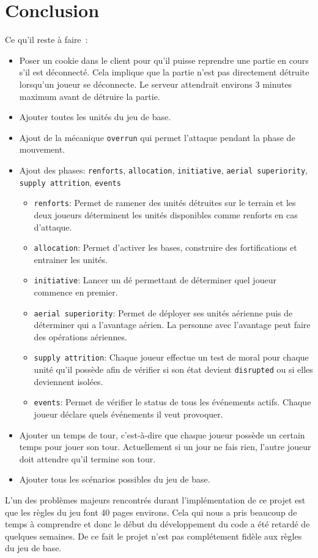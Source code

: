 \section{Conclusion}

Ce qu'il reste à faire :
\begin{itemize}
    \item Poser un cookie dans le client pour qu'il puisse reprendre une partie en cours s'il est déconnecté.
          Cela implique que la partie n'est pas directement détruite lorsqu'un joueur se déconnecte. Le serveur attendrait environs 3 minutes maximum avant de détruire la partie.
    \item Ajouter toutes les unités du jeu de base.
    \item Ajout de la mécanique {\tt overrun} qui permet l'attaque pendant la phase de mouvement.
    \item Ajout des phases: {\tt renforts}, {\tt allocation}, {\tt initiative}, {\tt aerial superiority}, {\tt supply attrition}, {\tt events}
          \begin{itemize}
              \item {\tt renforts}: Permet de ramener des unités détruites sur le terrain et les deux joueurs déterminent les unités disponibles comme renforts en cas d'attaque.
              \item {\tt allocation}: Permet d'activer les bases, construire des fortifications et entrainer les unités.
              \item {\tt initiative}: Lancer un dé permettant de déterminer quel joueur commence en premier.
              \item {\tt aerial superiority}: Permet de déployer ses unités aérienne puis de déterminer qui a l'avantage aérien.
                    La personne avec l'avantage peut faire des opérations aériennes.
              \item {\tt supply attrition}: Chaque joueur effectue un test de moral pour chaque unité qu'il possède afin de vérifier si son état devient {\tt disrupted} ou si elles deviennent isolées.
              \item {\tt events}: Permet de vérifier le status de tous les événements actifs. Chaque joueur déclare quels événements il veut provoquer.
          \end{itemize}
    \item Ajouter un temps de tour, c'est-à-dire que chaque joueur possède un certain temps pour jouer son tour. Actuellement si un jour ne fais rien, l'autre joueur doit attendre qu'il termine son tour.
    \item Ajouter tous les scénarios possibles du jeu de base.
\end{itemize}

L'un des problèmes majeurs rencontrés durant l'implémentation de ce projet est que les règles du jeu font 40 pages environs.
Cela qui nous a pris beaucoup de temps à comprendre et donc le début du développement du code a été retardé de quelques semaines.
De ce fait le projet n'est pas complétement fidèle aux règles du jeu de base.